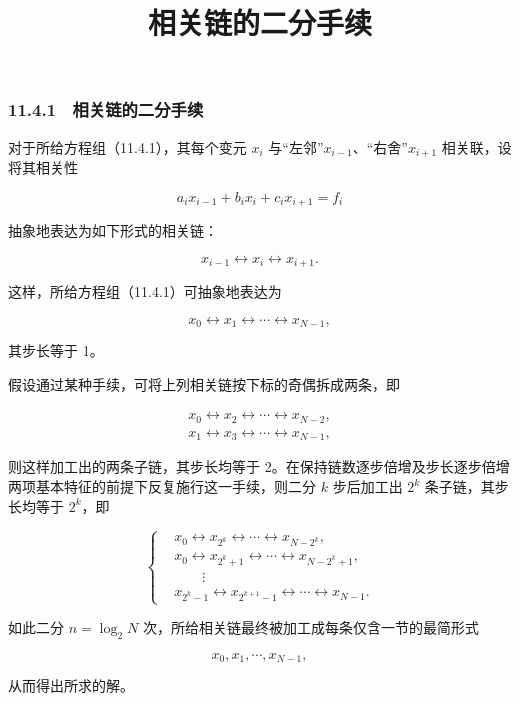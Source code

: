 \documentclass[
  10pt,
  fontset=fandol]{ctexart}
\title{相关链的二分手续}
\author{}
\date{}
\begin{document}
\maketitle

\subsubsection{11.4.1　相关链的二分手续}\label{ux76f8ux5173ux94feux7684ux4e8cux5206ux624bux7eed}

对于所给方程组（11.4.1），其每个变元 \(x_i\) 与``左邻''\(x_{i-1}\)、``右舍''\(x_{i+1}\) 相关联，设将其相关性

\[
a_ix_{i-1}+b_ix_i+c_ix_{i+1}=f_i
\]

抽象地表达为如下形式的相关链：

\[
x_{i-1}\leftrightarrow x_i\leftrightarrow x_{i+1}.
\]

这样，所给方程组（11.4.1）可抽象地表达为

\[
x_0\leftrightarrow x_1\leftrightarrow\cdots\leftrightarrow x_{N-1},
\]

其步长等于 1。

假设通过某种手续，可将上列相关链按下标的奇偶拆成两条，即

\[
\begin{gathered}
x_0\leftrightarrow x_2\leftrightarrow\cdots\leftrightarrow x_{N-2},\\
x_1\leftrightarrow x_3\leftrightarrow\cdots\leftrightarrow x_{N-1},
\end{gathered}
\]

则这样加工出的两条子链，其步长均等于 2。在保持链数逐步倍增及步长逐步倍增两项基本特征的前提下反复施行这一手续，则二分 \(k\) 步后加工出 \(2^k\) 条子链，其步长均等于 \(2^k\)，即

\[
\left\{
\begin{aligned}
&x_0\leftrightarrow x_{2^k}\leftrightarrow\cdots\leftrightarrow x_{N-2^k},\\
&x_0\leftrightarrow x_{2^k+1}\leftrightarrow\cdots\leftrightarrow x_{N-2^k+1},\\
&\qquad\vdots\\
&x_{2^k-1}\leftrightarrow x_{2^{k+1}-1}\leftrightarrow\cdots\leftrightarrow x_{N-1}.
\end{aligned}
\right.
\tag{11.4.2}
\]

如此二分 \(n=\log_2 N\) 次，所给相关链最终被加工成每条仅含一节的最简形式

\[
x_0,x_1,\cdots,x_{N-1},
\]

从而得出所求的解。
\end{document}
